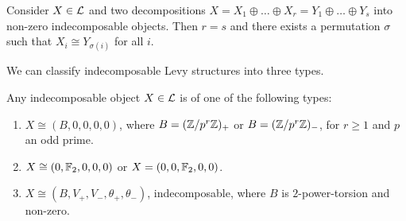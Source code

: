 \begin{cor} \cite[Theorem 4.2]{Krause}\label{cor:KSforLevyStr}
  Consider $X\in {\mathcal L}$ and two decompositions
  $X= X_1 \oplus \ldots \oplus X_r= Y_1 \oplus \ldots \oplus Y_s$ into non-zero indecomposable objects.
  Then $r=s$ and there exists a permutation $\sigma$ such that $X_i \cong Y_{\sigma (i)}$ for all $i$.
\end{cor}

We can classify indecomposable Levy structures into three types.

\begin{lemma}\label{lem:indecomlevystr}
  Any indecomposable object $X \in {\mathcal L}$ is of one of the following types:
  \begin{enumerate}
    \item $X \cong (B,0,0,0,0)$, where $B = ({\mathbb Z} / p^r {\mathbb Z})_+$ or $B = ({\mathbb Z} / p^r {\mathbb Z})_-$, for $r \geq 1$ and $p$ an odd prime.
    \item $X \cong (0,{\mathbb F}_2,0,0,0)$ or $X = (0, 0, {\mathbb F}_2,0,0)$.
    \item $X \cong (B, V_+, V_-, {\theta_+},{\theta_-})$, indecomposable, where $B$ is $2$-power-torsion and non-zero.
  \end{enumerate}
\end{lemma}

